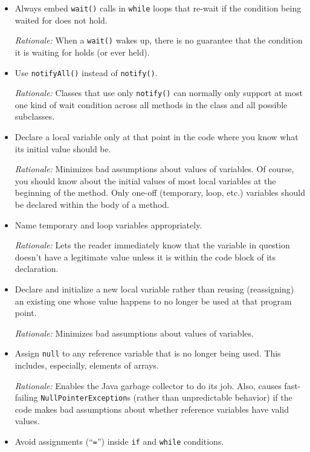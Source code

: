\begin{itemize}
    \item 
    Always embed \texttt{wait()} calls in \texttt{while} loops that re-wait if the condition being waited for does not hold.

    \emph{Rationale:} When a \texttt{wait()} wakes up, there is no guarantee that the condition it is waiting for holds (or ever held).

    \item 
    Use \texttt{notifyAll()} instead of \texttt{notify()}.

    \emph{Rationale:} Classes that use only \texttt{notify()} can normally only support at most one kind of wait condition across all methods in the class and all possible subclasses.

    \item 
    Declare a local variable only at that point in the code where you know what its initial value should be.

    \emph{Rationale:} Minimizes bad assumptions about values of variables. Of course, you should know about the initial values of most local variables at the beginning of the method. Only one-off (temporary, loop, etc.) variables should be declared within the body of a method.

    \item 
    Name temporary and loop variables appropriately.

    \emph{Rationale:} Lets the reader immediately know that the variable in question doesn't have a legitimate value unless it is within the code block of its declaration.

    \item 
    Declare and initialize a new local variable rather than reusing (reassigning) an existing one whose value happens to no longer be used at that program point.

    \emph{Rationale:} Minimizes bad assumptions about values of variables.

    \item
    Assign \texttt{null} to any reference variable that is no longer being used. This includes, especially, elements of arrays.

    \emph{Rationale:} Enables the Java garbage collector to do its job. Also, causes fast-failing \texttt{NullPointerException}s (rather than unpredictable behavior) if the code makes bad assumptions about whether reference variables have valid values.

    \item 
    Avoid assignments (``\texttt{=}'') inside \texttt{if} and \texttt{while} conditions.


\end{itemize}
